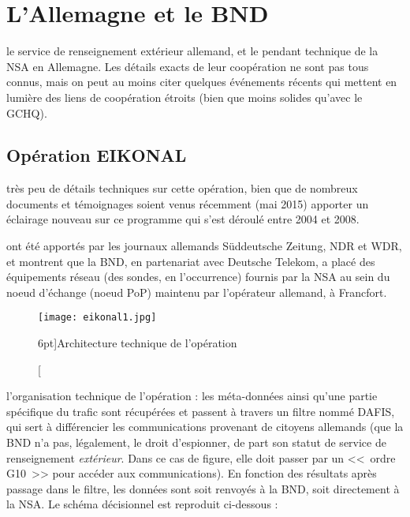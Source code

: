 \newpage
\section{L'Allemagne et le BND}

 le service de
renseignement extérieur allemand, et le pendant technique de la NSA en
Allemagne. Les détails exacts de leur coopération ne sont pas tous connus, mais
on peut au moins citer quelques événements récents qui mettent en lumière des
liens de coopération étroits (bien que moins solides qu'avec le GCHQ).

\subsection{Opération EIKONAL}

 très peu de détails techniques sur cette
opération, bien que de nombreux documents et témoignages soient venus récemment
(mai 2015) apporter un éclairage nouveau sur ce programme qui s'est déroulé entre 2004 et
2008.

 ont été apportés par les journaux allemands
Süddeutsche Zeitung\cite{sudde}, NDR et WDR\cite{NDR}, et montrent que la BND,
en partenariat avec Deutsche Telekom, a placé des équipements réseau (des
sondes, en l'occurrence) fournis par la NSA au sein du noeud d'échange (noeud
PoP) maintenu par l'opérateur allemand, à Francfort.

\vspace{0.7cm}
\begin{figure}
\texttt{[image: eikonal1.jpg]}
\caption[Architecture de l'opération EIKONAL][6pt]{Architecture
technique de l'opération}
\label{fig:eikonal1}
\end{figure}

 l'organisation technique de l'opération : les
méta-données ainsi qu'une partie spécifique du trafic sont récupérées et passent
à travers un filtre nommé DAFIS\label{dafis}, qui sert à différencier les
communications provenant de citoyens allemands (que la BND n'a pas, légalement, le droit
d'espionner, de part son statut de service de renseignement \emph{extérieur}.
Dans ce cas de figure, elle doit passer par un <<~ordre G10~>> pour accéder
aux communications).
En fonction des résultats après passage dans le filtre, les données sont soit
renvoyés à la BND, soit directement à la NSA. Le schéma décisionnel est
reproduit ci-dessous :

